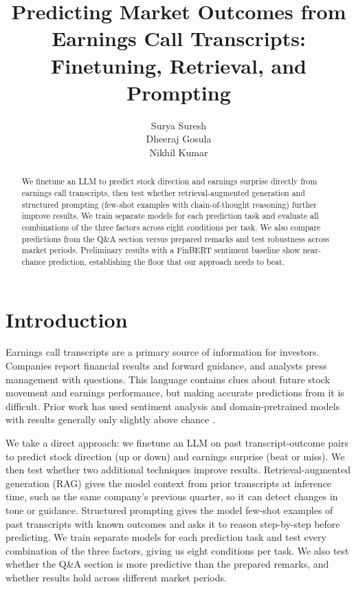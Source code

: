 \documentclass[11pt]{article}
\title{Predicting Market Outcomes from Earnings Call Transcripts:\\Finetuning, Retrieval, and Prompting}
\author{
Surya Suresh \\
\And
Dheeraj Gosula \\
\And
Nikhil Kumar \\
}
\begin{document}
\maketitle

\begin{abstract}
We finetune an LLM to predict stock direction and earnings surprise directly from earnings call transcripts, then test whether retrieval-augmented generation and structured prompting (few-shot examples with chain-of-thought reasoning) further improve results. We train separate models for each prediction task and evaluate all combinations of the three factors across eight conditions per task. We also compare predictions from the Q\&A section versus prepared remarks and test robustness across market periods. Preliminary results with a FinBERT sentiment baseline show near-chance prediction, establishing the floor that our approach needs to beat.
\end{abstract}

\section{Introduction}

Earnings call transcripts are a primary source of information for investors. Companies report financial results and forward guidance, and analysts press management with questions. This language contains clues about future stock movement and earnings performance, but making accurate predictions from it is difficult. Prior work has used sentiment analysis and domain-pretrained models with results generally only slightly above chance \citep{Qin2019}.

We take a direct approach: we finetune an LLM on past transcript-outcome pairs to predict stock direction (up or down) and earnings surprise (beat or miss). We then test whether two additional techniques improve results. Retrieval-augmented generation (RAG) gives the model context from prior transcripts at inference time, such as the same company's previous quarter, so it can detect changes in tone or guidance. Structured prompting gives the model few-shot examples of past transcripts with known outcomes and asks it to reason step-by-step before predicting. We train separate models for each prediction task and test every combination of the three factors, giving us eight conditions per task. We also test whether the Q\&A section is more predictive than the prepared remarks, and whether results hold across different market periods.
\end{document}
